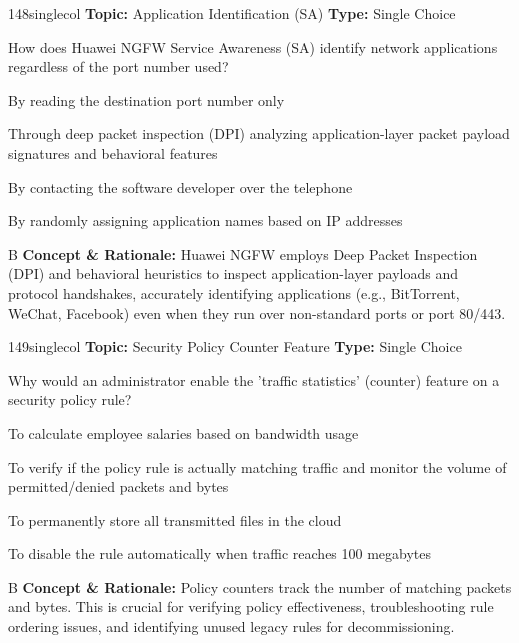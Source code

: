 \begin{qcard}{148}{singlecol}
\textcolor{darkslate!75}{\small\textbf{Topic:} Application Identification (SA) \hfill \textbf{Type:} Single Choice}\vspace{0.4em}\par
How does Huawei NGFW Service Awareness (SA) identify network applications regardless of the port number used?
\begin{qoptions}
\item By reading the destination port number only
\item Through deep packet inspection (DPI) analyzing application-layer packet payload signatures and behavioral features
\item By contacting the software developer over the telephone
\item By randomly assigning application names based on IP addresses
\end{qoptions}
\end{qcard}
\nopagebreak
\begin{explainbox}{B}
\textbf{Concept \& Rationale:} Huawei NGFW employs Deep Packet Inspection (DPI) and behavioral heuristics to inspect application-layer payloads and protocol handshakes, accurately identifying applications (e.g., BitTorrent, WeChat, Facebook) even when they run over non-standard ports or port 80/443.
\end{explainbox}

\begin{qcard}{149}{singlecol}
\textcolor{darkslate!75}{\small\textbf{Topic:} Security Policy Counter Feature \hfill \textbf{Type:} Single Choice}\vspace{0.4em}\par
Why would an administrator enable the 'traffic statistics' (counter) feature on a security policy rule?
\begin{qoptions}
\item To calculate employee salaries based on bandwidth usage
\item To verify if the policy rule is actually matching traffic and monitor the volume of permitted/denied packets and bytes
\item To permanently store all transmitted files in the cloud
\item To disable the rule automatically when traffic reaches 100 megabytes
\end{qoptions}
\end{qcard}
\nopagebreak
\begin{explainbox}{B}
\textbf{Concept \& Rationale:} Policy counters track the number of matching packets and bytes. This is crucial for verifying policy effectiveness, troubleshooting rule ordering issues, and identifying unused legacy rules for decommissioning.
\end{explainbox}

